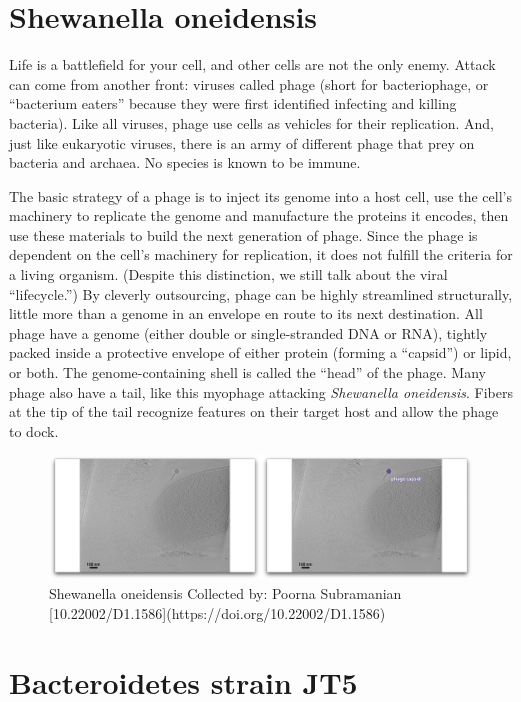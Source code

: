 \documentclass[]{tufte-book}
\begin{document}
\section{Shewanella oneidensis}\label{shewanella-oneidensis}

Life is a battlefield for your cell, and other cells are not the only
enemy. Attack can come from another front: viruses called phage (short
for bacteriophage, or ``bacterium eaters'' because they were first
identified infecting and killing bacteria). Like all viruses, phage use
cells as vehicles for their replication. And, just like eukaryotic
viruses, there is an army of different phage that prey on bacteria and
archaea. No species is known to be immune.

The basic strategy of a phage is to inject its genome into a host cell,
use the cell's machinery to replicate the genome and manufacture the
proteins it encodes, then use these materials to build the next
generation of phage. Since the phage is dependent on the cell's
machinery for replication, it does not fulfill the criteria for a living
organism. (Despite this distinction, we still talk about the viral
``lifecycle.'') By cleverly outsourcing, phage can be highly streamlined
structurally, little more than a genome in an envelope en route to its
next destination. All phage have a genome (either double or
single-stranded DNA or RNA), tightly packed inside a protective envelope
of either protein (forming a ``capsid'') or lipid, or both. The
genome-containing shell is called the ``head'' of the phage. Many phage
also have a tail, like this myophage attacking \emph{Shewanella
oneidensis}. Fibers at the tip of the tail recognize features on their
target host and allow the phage to dock.

\begin{figure}
\includegraphics{movie_stills/10_1} \caption[Shewanella oneidensis Collected by]{Shewanella oneidensis Collected by: Poorna Subramanian [10.22002/D1.1586](https://doi.org/10.22002/D1.1586)}\label{fig:unnamed-chunk-173}
\end{figure}

\section{Bacteroidetes strain JT5}\label{bacteroidetes-strain-jt5}
\end{document}
